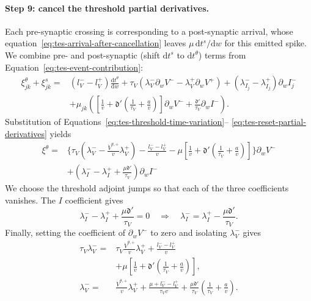 \paragraph{Step 9: cancel the threshold partial derivatives.}
Each pre-synaptic crossing is corresponding to a post-synaptic arrival, whose equation~\eqref{eq:tes-arrival-after-cancellation} leaves $\mu\,\mathrm dt^s/\mathrm dw$ for this emitted spike. We combine pre- and post-synaptic (shift $\mathrm dt^s$ to $\mathrm dt^\theta$) terms from
Equation~\eqref{eq:tes-event-contribution}:
\begin{align}
    \xi^\theta_{jk} + \xi^s_{jk}={}&
     \left(l_V^- -l_V^+\right)\frac{\mathrm dt^\theta}{\mathrm dw}
     +\tau_V\left(
        \lambda_V^-\partial_wV^-
        -\lambda_V^+\partial_wV^+\right)
     +(\lambda_{I_j}^-
       -\lambda_{I_j}^+)\partial_wI_j^-
     \nonumber\\
    &
     +\mu_{jk}\left(\left[
          \frac{1}{v}
          +\mathfrak d'
           \left(\frac{1}{\tau_V}+\frac{a}{v}\right)
        \right]\partial_wV^-
       +\frac{\mathfrak d'}{\tau_V}\partial_wI^-\right).
    \label{eq:tes-threshold-boundary-before-substitution}
\end{align}
Substitution of Equations~\eqref{eq:tes-threshold-time-variation}--
\eqref{eq:tes-reset-partial-derivatives} yields
\begin{align}
    \xi^\theta={}&
      \Bigg\{
        \tau_V\left(
        \lambda_V^-
        -\frac{\dot V^{\theta,+}}{v}\lambda_V^+
        \right)
        -\frac{l_V^- -l_V^+}{v}
        -\mu\left[
          \frac{1}{v}
          +\mathfrak d'\left(\frac{1}{\tau_V}+\frac{a}{v}\right)
        \right]
      \Bigg\}\partial_wV^-
      \nonumber\\
    &+\left(
        \lambda_I^- -\lambda_I^+
        +\frac{\mu\mathfrak d'}{\tau_V}
      \right)\partial_wI^-
    \label{eq:tes-threshold-collected}
\end{align}
We choose the threshold adjoint jumps so that each of the three coefficients
vanishes. 
The $I$ coefficient gives
\begin{equation}
    \lambda_I^- -\lambda_I^+
      +\frac{\mu\mathfrak d'}{\tau_V}=0
    \quad\Longrightarrow\quad
    \lambda_I^-=\lambda_I^+
      -\frac{\mu\mathfrak d'}{\tau_V}.
    \label{eq:tes-boundary-coefficient-i}
\end{equation}
Finally, setting the coefficient of $\partial_wV^-$ to zero and isolating
$\lambda_V^-$ gives
\begin{align}
    \tau_V\lambda_V^-
      ={}&\tau_V\frac{\dot V^{\theta,+}}{v}\lambda_V^+
       +\frac{l_V^- -l_V^+}{v}
       \nonumber\\
      &+\mu\left[
          \frac{1}{v}
          +\mathfrak d'\left(
             \frac{1}{\tau_V}+\frac{a}{v}
          \right)
       \right],
    \label{eq:tes-boundary-coefficient-v-before-division}\\
    \lambda_V^-
      ={}&\frac{\dot V^{\theta,+}}{v}\lambda_V^+
       +\frac{\mu+l_V^- -l_V^+}{\tau_Vv}
       +\frac{\mu\mathfrak d'}{\tau_V}
        \left(\frac{1}{\tau_V}+\frac{a}{v}\right).
    \label{eq:tes-boundary-coefficient-v}
\end{align}
